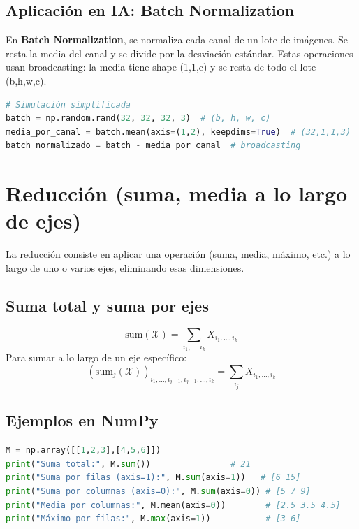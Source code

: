 \documentclass[12pt,a4paper,openany,oneside]{book}
\begin{document}
\subsection{Aplicación en IA: Batch Normalization}
En \textbf{Batch Normalization}, se normaliza cada canal de un lote de imágenes. Se resta la media del canal y se divide por la desviación estándar. Estas operaciones usan broadcasting: la media tiene shape (1,1,c) y se resta de todo el lote (b,h,w,c).

\begin{lstlisting}[language=Python]
# Simulación simplificada
batch = np.random.rand(32, 32, 32, 3)  # (b, h, w, c)
media_por_canal = batch.mean(axis=(1,2), keepdims=True)  # (32,1,1,3)
batch_normalizado = batch - media_por_canal  # broadcasting
\end{lstlisting}

\section{Reducción (suma, media a lo largo de ejes)}

La reducción consiste en aplicar una operación (suma, media, máximo, etc.) a lo largo de uno o varios ejes, eliminando esas dimensiones.

\subsection{Suma total y suma por ejes}
\begin{equation*}
\text{sum}(\mathcal{X}) = \sum_{i_1,\dots,i_k} X_{i_1,\dots,i_k}
\end{equation*}
Para sumar a lo largo de un eje específico:
\begin{equation*}
(\text{sum}_j(\mathcal{X}))_{i_1,\dots,i_{j-1},i_{j+1},\dots,i_k} = \sum_{i_j} X_{i_1,\dots,i_k}
\end{equation*}

\subsection{Ejemplos en NumPy}
\begin{lstlisting}[language=Python]
M = np.array([[1,2,3],[4,5,6]])
print("Suma total:", M.sum())                # 21
print("Suma por filas (axis=1):", M.sum(axis=1))   # [6 15]
print("Suma por columnas (axis=0):", M.sum(axis=0)) # [5 7 9]
print("Media por columnas:", M.mean(axis=0))        # [2.5 3.5 4.5]
print("Máximo por filas:", M.max(axis=1))           # [3 6]
\end{lstlisting}
\end{document}
